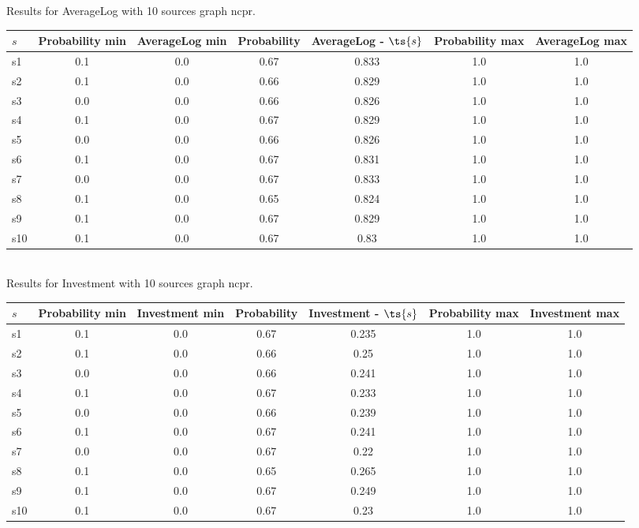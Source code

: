 \documentclass{article}
\begin{document}
\noindent Results for AverageLog with 10 sources graph ncpr.

\noindent\begin{tabular}{|l|c|c|c|c|c|c|}
\hline
$s$& Probability min & AverageLog min & Probability & AverageLog - $\ts{s}$ & Probability max & AverageLog max\\
\hline
s1 &0.1 & 0.0 & 0.67 & 0.833 & 1.0 & 1.0\\
\hline
s2 &0.1 & 0.0 & 0.66 & 0.829 & 1.0 & 1.0\\
\hline
s3 &0.0 & 0.0 & 0.66 & 0.826 & 1.0 & 1.0\\
\hline
s4 &0.1 & 0.0 & 0.67 & 0.829 & 1.0 & 1.0\\
\hline
s5 &0.0 & 0.0 & 0.66 & 0.826 & 1.0 & 1.0\\
\hline
s6 &0.1 & 0.0 & 0.67 & 0.831 & 1.0 & 1.0\\
\hline
s7 &0.0 & 0.0 & 0.67 & 0.833 & 1.0 & 1.0\\
\hline
s8 &0.1 & 0.0 & 0.65 & 0.824 & 1.0 & 1.0\\
\hline
s9 &0.1 & 0.0 & 0.67 & 0.829 & 1.0 & 1.0\\
\hline
s10 &0.1 & 0.0 & 0.67 & 0.83 & 1.0 & 1.0\\
\hline
\end{tabular}\\

\noindent Results for Investment with 10 sources graph ncpr.

\noindent\begin{tabular}{|l|c|c|c|c|c|c|}
\hline
$s$& Probability min & Investment min & Probability & Investment - $\ts{s}$ & Probability max & Investment max\\
\hline
s1 &0.1 & 0.0 & 0.67 & 0.235 & 1.0 & 1.0\\
\hline
s2 &0.1 & 0.0 & 0.66 & 0.25 & 1.0 & 1.0\\
\hline
s3 &0.0 & 0.0 & 0.66 & 0.241 & 1.0 & 1.0\\
\hline
s4 &0.1 & 0.0 & 0.67 & 0.233 & 1.0 & 1.0\\
\hline
s5 &0.0 & 0.0 & 0.66 & 0.239 & 1.0 & 1.0\\
\hline
s6 &0.1 & 0.0 & 0.67 & 0.241 & 1.0 & 1.0\\
\hline
s7 &0.0 & 0.0 & 0.67 & 0.22 & 1.0 & 1.0\\
\hline
s8 &0.1 & 0.0 & 0.65 & 0.265 & 1.0 & 1.0\\
\hline
s9 &0.1 & 0.0 & 0.67 & 0.249 & 1.0 & 1.0\\
\hline
s10 &0.1 & 0.0 & 0.67 & 0.23 & 1.0 & 1.0\\
\hline
\end{tabular}\\
\end{document}
